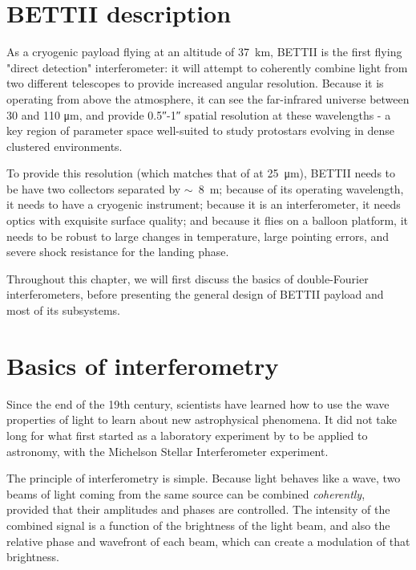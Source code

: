 \section{BETTII description}

As a cryogenic payload flying at an altitude of \SI{37}{\kilo\meter}, BETTII is the first flying "direct detection" interferometer: it will attempt to coherently combine light from two different telescopes to provide increased angular resolution. Because it is operating from above the atmosphere, it can see the far-infrared universe between 30 and 110 \si{\micro\meter}, and provide \ang{;;0.5}-\ang{;;1} spatial resolution at these wavelengths - a key region of parameter space well-suited to study protostars evolving in dense clustered environments.

To provide this resolution (which matches that of \JWST  at \SI{25}{\micro\meter}), BETTII needs to be have two collectors separated by $\sim$~\SI{8}{\meter}; because of its operating wavelength, it needs to have a cryogenic instrument; because it is an interferometer, it needs optics with exquisite surface quality; and because it flies on a balloon platform, it needs to be robust to large changes in temperature, large pointing errors, and severe shock resistance for the landing phase.

Throughout this chapter, we will first discuss the basics of double-Fourier interferometers, before presenting the general design of BETTII payload and most of its subsystems.


\section{Basics of interferometry}

Since the end of the 19th century, scientists have learned how to use the wave properties of light to learn about new astrophysical phenomena. It did not take long for what first started as a laboratory experiment by \citet{Michelson:1887wc} to be applied to astronomy, with the Michelson Stellar Interferometer experiment. 

The principle of interferometry is simple. Because light behaves like a wave, two beams of light coming from the same source can be combined \textit{coherently}, provided that their amplitudes and phases are controlled. The intensity of the combined signal is a function of the brightness of the light beam, and also the relative phase and wavefront of each beam, which can create a modulation of that brightness.

